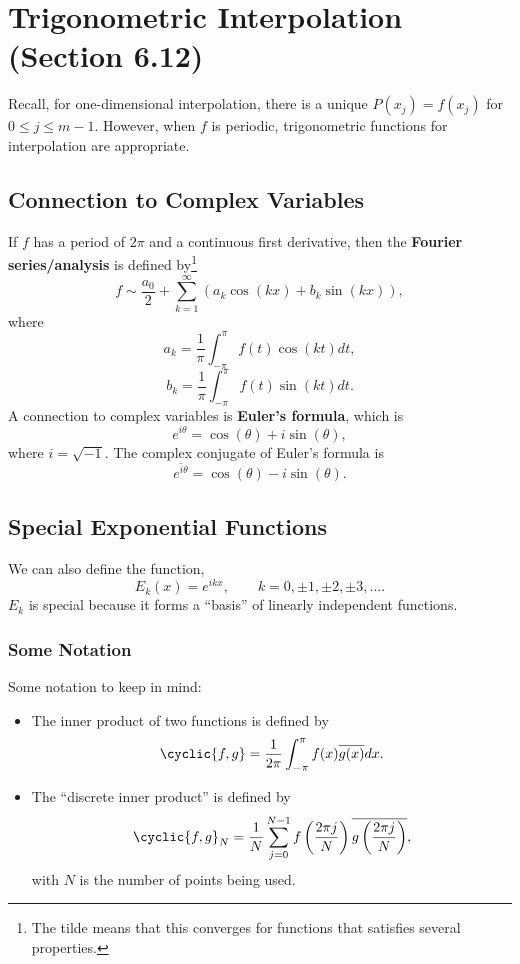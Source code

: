\documentclass[letterpaper]{article}
\begin{document}
\section{Trigonometric Interpolation (Section 6.12)}
Recall, for one-dimensional interpolation, there is a unique $P(x_j) = f(x_j)$ for $0 \leq j \leq m - 1$. However, when $f$ is periodic, trigonometric functions for interpolation are appropriate.

\subsection{Connection to Complex Variables}
If $f$ has a period of $2\pi$ and a continuous first derivative, then the \textbf{Fourier series/analysis} is defined by\footnote{The tilde means that this converges for functions that satisfies several properties.}
\[ f \sim \frac{a_0}{2} + \sum_{k = 1}^{\infty} (a_{k} \cos(kx) + b_k \sin(kx)), \]
where \[a_k = \frac{1}{\pi} \int_{-\pi}^{\pi} f(t)\cos(kt) dt,\]
\[b_k = \frac{1}{\pi} \int_{-\pi}^{\pi} f(t) \sin(kt) dt.\]
A connection to complex variables is \textbf{Euler's formula}, which is 
\[e^{i\theta} = \cos(\theta) + i\sin(\theta),\] where $i = \sqrt{-1}$. The complex conjugate of Euler's formula is 
\[\overline{e^{i\theta}} = \cos(\theta) - i\sin(\theta).\]

\subsection{Special Exponential Functions}
We can also define the function, 
\[E_{k}(x) = e^{ikx}, \qquad k = 0, \pm 1, \pm 2, \pm 3, \hdots.\]
$E_{k}$ is special because it forms a ``basis'' of linearly independent functions.

\subsubsection{Some Notation}
Some notation to keep in mind: 
\begin{itemize}
    \item The inner product of two functions is defined by
    \[\cyclic{f, g} = \frac{1}{2\pi} \int_{-\pi}^{\pi} f(x) \overline{g(x)} dx.\]

    \item The ``discrete inner product'' is defined by
    \[\cyclic{f, g}_{N} = \frac{1}{N} \sum_{j = 0}^{N - 1} f\left(\frac{2\pi j}{N}\right) \overline{g\left(\frac{2\pi j}{N}\right)},\]
    with $N$ is the number of points being used.
\end{itemize}
\end{document}
